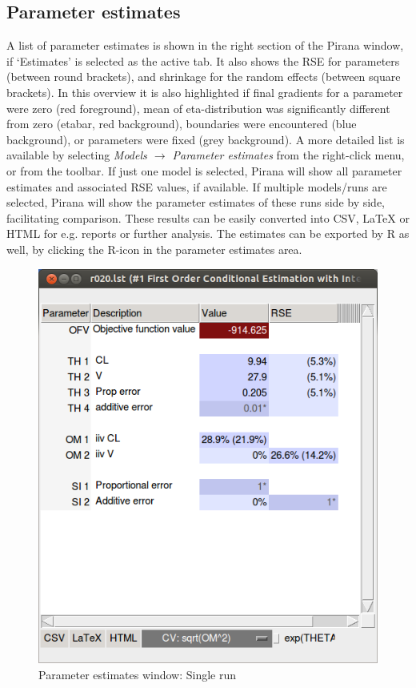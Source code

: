 {{{\subsection{Parameter estimates}
A list of parameter estimates is shown in the right section of the Pirana window,
if `Estimates' is selected as the active tab. It also shows the RSE for parameters (between round brackets),
and shrinkage for the random effects (between square brackets). In this overview it is also highlighted if
final gradients for a parameter were zero (red foreground), mean of eta-distribution was significantly different from zero (etabar, red background), boundaries were encountered (blue background), or parameters were fixed (grey background).
A more detailed list is available by selecting \textit{Models $\rightarrow$ Parameter estimates} from the right-click menu, or from the toolbar. If just
one model is selected, Pirana will show all parameter estimates and
associated RSE values, if available. If multiple models/runs are
selected, Pirana will show the parameter estimates of these runs side
by side, facilitating comparison. These results can be easily
converted into CSV, LaTeX or HTML for e.g. reports or further
analysis. The estimates can be exported by R as well, by clicking the
R-icon in the parameter estimates area.

\begin{figure}[H] \centering
    \includegraphics[scale=0.3]{images/estimates_window.png}
    \caption{Parameter estimates window: Single run}
\end{figure}

}}}
